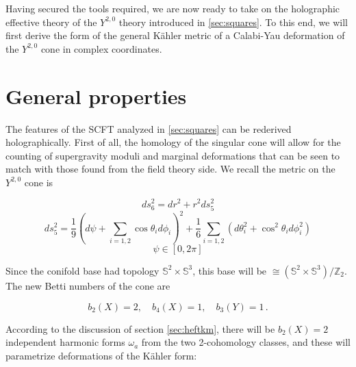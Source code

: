 %
%
%
\graphicspath{{images/}}
%

\label{chap:y20}

%

Having secured the tools required, we are now ready to take on the holographic effective theory of the $Y^{2,0}$ theory introduced in \ref{sec:squares}. To this end, we will first derive the form of the general K\"ahler metric of a Calabi-Yau deformation of the $Y^{2,0}$ cone in complex coordinates.

\section{General properties}

The features of the SCFT analyzed in \ref{sec:squares} can be rederived holographically. First of all, the homology of the singular cone will allow for the counting of supergravity moduli and marginal deformations that can be seen to match with those found from the field theory side. We recall the metric on the $Y^{2,0}$ cone is

\begin{equation}
	ds_6^2 = dr^2 + r^2 ds_5^2
	\label{}
\end{equation}
\begin{equation}
	ds_5^2 = \frac{1}{9}\left( d\psi + \sum_{i=1,2} \cos\theta_i d\phi_i\right)^2 + 
	\frac{1}{6} \sum_{i=1,2} \left(d\theta_i^2 + \cos^2\theta_i d\phi_i^2 \right)
\end{equation}
\begin{equation}
	\psi \in [0,2\pi]
	\label{}
\end{equation}

Since the conifold base had topology $\mathbb{S}^2 \times \mathbb{S}^3$, this base will be $\cong (\mathbb{S}^2 \times \mathbb{S}^3)/\mathbb{Z}_2$. The new Betti numbers of the cone are

\begin{equation}
	b_2(X) = 2,\quad b_4(X) = 1,\quad b_3(Y) = 1\,.
	\label{}
\end{equation}

According to the discussion of section \ref{sec:heftkm}, there will be $b_2(X) = 2$ independent harmonic forms $\omega_a$ from the two 2-cohomology classes, and these will parametrize deformations of the K\"ahler form:

